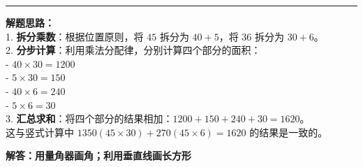 \documentclass[12pt, a4paper]{ctexart}
\begin{document}
\begin{center}
\begin{minipage}{0.55\textwidth}
  \end{minipage}
\end{center}

\vspace{1.0cm}
\hrule
\vspace{0.4cm}

{\small
\textbf{解题思路：} \\
1. \textbf{拆分乘数}：根据位置原则，将 $45$ 拆分为 $40 + 5$，将 $36$ 拆分为 $30 + 6$。 \\
2. \textbf{分步计算}：利用乘法分配律，分别计算四个部分的面积： \\
   - $40 \times 30 = 1200$ \\
   - $5 \times 30 = 150$ \\
   - $40 \times 6 = 240$ \\
   - $5 \times 6 = 30$ \\
3. \textbf{汇总求和}：将四个部分的结果相加：$1200 + 150 + 240 + 30 = 1620$。 \\
这与竖式计算中 $1350 (45 \times 30) + 270 (45 \times 6) = 1620$ 的结果是一致的。
}


\newpage

\begin{center}
  {\large\bfseries 解答：用量角器画角；利用垂直线画长方形}
\end{center}

\vspace{0.8cm}


\vspace{0.6cm}
\end{document}
